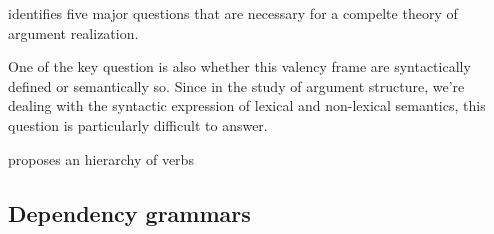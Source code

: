 \citet{levin2005} identifies five major questions that are necessary for a compelte theory of argument realization.


One of the key question is also whether this valency frame are syntactically defined or semantically so. Since in the study of argument structure, we're dealing with the syntactic expression of lexical and non-lexical semantics, this question is particularly difficult to answer.


\citet{tsunoda1981, tsunoda1985} proposes an hierarchy of verbs



\subsection{Dependency grammars}



